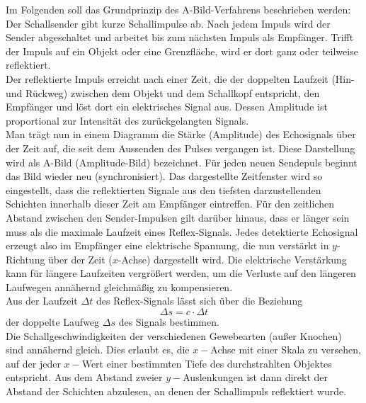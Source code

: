 \noindent
Im Folgenden soll das Grundprinzip des A-Bild-Verfahrens beschrieben werden: Der Schallsender gibt kurze Schallimpulse ab. Nach jedem Impuls wird der Sender abgeschaltet und arbeitet bis zum nächsten Impuls als Empfänger. Trifft der Impuls auf ein Objekt oder eine Grenzfläche, wird er dort ganz oder teilweise reflektiert.\\
Der reflektierte Impuls erreicht nach einer Zeit, die der doppelten Laufzeit (Hin- und Rückweg) zwischen dem Objekt und dem Schallkopf entspricht, den Empfänger und löst dort ein elektrisches Signal aus. Dessen Amplitude ist proportional zur Intensität des zurückgelangten Signals.\\
Man trägt nun in einem Diagramm die Stärke (Amplitude) des Echosignals über der Zeit auf, die seit dem Aussenden des Pulses vergangen ist. Diese Darstellung wird als A-Bild (Amplitude-Bild) bezeichnet. Für jeden neuen Sendepuls beginnt das Bild wieder neu (synchronisiert). Das dargestellte Zeitfenster wird so eingestellt, dass die reflektierten Signale aus den tiefsten darzustellenden Schichten innerhalb dieser Zeit am Empfänger eintreffen. Für den zeitlichen Abstand zwischen den Sender-Impulsen gilt darüber hinaus, dass er länger sein muss als die maximale Laufzeit eines Reflex-Signals. Jedes detektierte Echosignal erzeugt also im Empfänger eine elektrische Spannung, die nun verstärkt in $y$-Richtung über der Zeit ($x$-Achse) dargestellt wird. Die elektrische Verstärkung kann für längere Laufzeiten vergrößert werden, um die Verluste auf den längeren Laufwegen annähernd gleichmäßig zu kompensieren.\\

\noindent
Aus der Laufzeit $\Delta t$ des Reflex-Signals lässt sich über die Beziehung
\begin{equation*}
	\Delta s = c\cdot \Delta t
\end{equation*}
der doppelte Laufweg $\Delta s$ des Signals bestimmen.\\
Die Schallgeschwindigkeiten der verschiedenen Gewebearten (außer Knochen) sind annähernd gleich. Dies erlaubt es, die $x-$Achse mit einer Skala zu versehen, auf der jeder $x-$Wert einer bestimmten Tiefe des durchstrahlten Objektes entspricht. Aus dem Abstand zweier $y-$Auslenkungen ist dann direkt der Abstand der Schichten abzulesen, an denen der Schallimpuls reflektiert wurde.\\

